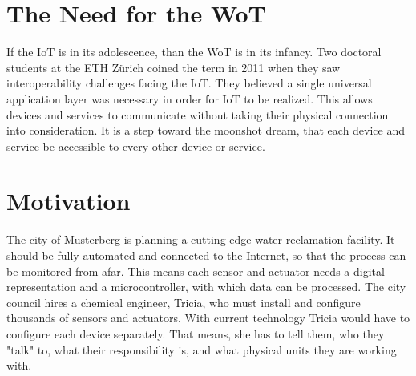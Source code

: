 

\section{The Need for the WoT}

If the IoT is in its adolescence, than the WoT is in its infancy. Two doctoral students at the ETH Zürich coined the term in 2011 when they saw interoperability challenges facing the IoT. They believed a single universal application layer was necessary in order for IoT to be realized. This allows devices and services to communicate without taking their physical connection into consideration. \cite{Guinard2016} It is a step toward the moonshot dream, that each device and service be accessible to every other device or service.


\section{Motivation}

The city of Musterberg is planning a cutting-edge water reclamation facility. It should be fully automated and connected to the Internet, so that the process can be monitored from afar. This means each sensor and actuator needs a digital representation and a microcontroller, with which data can be processed. The city council hires a chemical engineer, Tricia, who must install and configure thousands of sensors and actuators. With current technology Tricia would have to configure each device separately. That means, she has to tell them, who they "talk" to, what their responsibility is, and what physical units they are working with.

